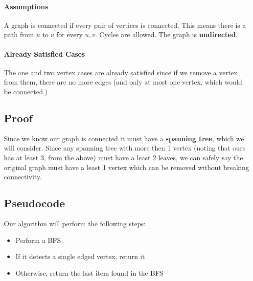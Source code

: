 \documentclass[12pt]{article}
\begin{document}
\paragraph{Assumptions}
A graph is connected if every pair of vertices is connected. This means there is a path from  $u$ to $v$ for every $u,v$. Cycles are allowed. The graph is {\bf undirected}.
\paragraph{Already Satisfied Cases}
The one and two vertex cases are already satisfied since if we remove a vertex from them, there are no more edges (and only at most one vertex, which would be connected.)
\subsection{Proof}
Since we know our graph is connected it must have a {\bf spanning tree}, which we will consider. Since any spanning tree with more then 1 vertex (noting that ours has at least 3, from the above) must have a least 2 leaves, we can safely say the original graph must have a least 1 vertex which can be removed without breaking connectivity.
\subsection{Pseudocode}
Our algorithm will perform the following steps:
\begin{itemize}
	\item Perform a BFS
	\item If it detects a single edged vertex, return it
	\item Otherwise, return the last item found in the BFS
\end{itemize}
\end{document}
